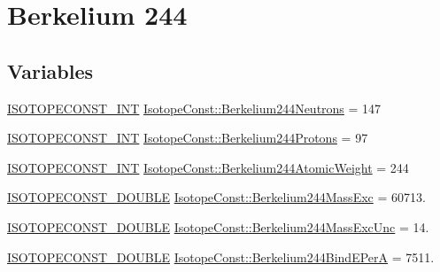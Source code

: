 \hypertarget{group___isotope_const-_berkelium-_bk244}{}\section{Berkelium 244}
\label{group___isotope_const-_berkelium-_bk244}
\subsection*{Variables}
\begin{DoxyCompactItemize}
\item 
\mbox{\hyperlink{group___isotope_const-_macros_ga5f18360b3e99483a35c32d789e62621c}{I\+S\+O\+T\+O\+P\+E\+C\+O\+N\+S\+T\+\_\+\+I\+NT}} \mbox{\hyperlink{group___isotope_const-_berkelium-_bk244_ga27f2d08555ddbd8eaa75bfacb9cc2fe0}{Isotope\+Const\+::\+Berkelium244\+Neutrons}} = 147
\item 
\mbox{\hyperlink{group___isotope_const-_macros_ga5f18360b3e99483a35c32d789e62621c}{I\+S\+O\+T\+O\+P\+E\+C\+O\+N\+S\+T\+\_\+\+I\+NT}} \mbox{\hyperlink{group___isotope_const-_berkelium-_bk244_ga3444b3daf739c754f02416a9bcb1da86}{Isotope\+Const\+::\+Berkelium244\+Protons}} = 97
\item 
\mbox{\hyperlink{group___isotope_const-_macros_ga5f18360b3e99483a35c32d789e62621c}{I\+S\+O\+T\+O\+P\+E\+C\+O\+N\+S\+T\+\_\+\+I\+NT}} \mbox{\hyperlink{group___isotope_const-_berkelium-_bk244_gabd61fc52a069939eaa02111d60f9ee47}{Isotope\+Const\+::\+Berkelium244\+Atomic\+Weight}} = 244
\item 
\mbox{\hyperlink{group___isotope_const-_macros_ga8f45a7272ce02c0b4c65c44636ed719a}{I\+S\+O\+T\+O\+P\+E\+C\+O\+N\+S\+T\+\_\+\+D\+O\+U\+B\+LE}} \mbox{\hyperlink{group___isotope_const-_berkelium-_bk244_ga9c3d66a7dc6acc70a817a5dde3a30ef8}{Isotope\+Const\+::\+Berkelium244\+Mass\+Exc}} = 60713.
\item 
\mbox{\hyperlink{group___isotope_const-_macros_ga8f45a7272ce02c0b4c65c44636ed719a}{I\+S\+O\+T\+O\+P\+E\+C\+O\+N\+S\+T\+\_\+\+D\+O\+U\+B\+LE}} \mbox{\hyperlink{group___isotope_const-_berkelium-_bk244_ga71d54238294c382673b83b3e819a145b}{Isotope\+Const\+::\+Berkelium244\+Mass\+Exc\+Unc}} = 14.
\item 
\mbox{\hyperlink{group___isotope_const-_macros_ga8f45a7272ce02c0b4c65c44636ed719a}{I\+S\+O\+T\+O\+P\+E\+C\+O\+N\+S\+T\+\_\+\+D\+O\+U\+B\+LE}} \mbox{\hyperlink{group___isotope_const-_berkelium-_bk244_ga549de29f7c68ef5fa4055f0106d64e1a}{Isotope\+Const\+::\+Berkelium244\+Bind\+E\+PerA}} = 7511.
\item 

\end{DoxyCompactItemize}
